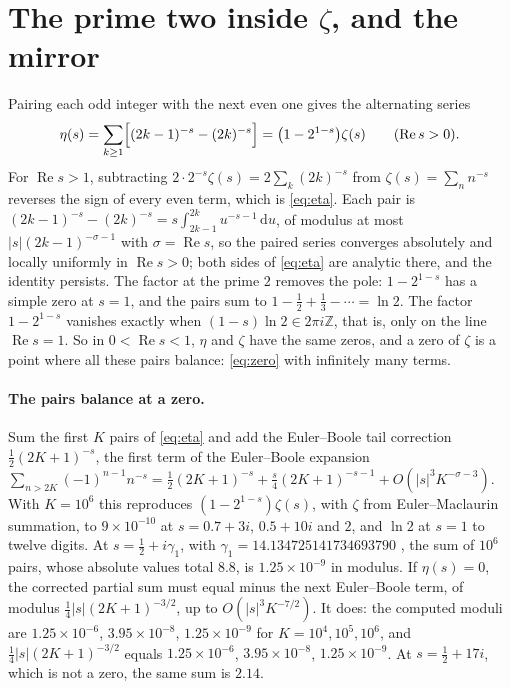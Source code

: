 \documentclass[11pt]{article}
\theoremstyle{definition}\newtheorem{definition}[theorem]{Definition}
\theoremstyle{remark}\newtheorem{remark}[theorem]{Remark}
\newcommand{\dd}{\,\mathrm d}\newcommand{\e}{\mathrm e}
\renewcommand{\Re}{\operatorname{Re}}\renewcommand{\Im}{\operatorname{Im}}
\begin{document}
\section{The prime two inside \texorpdfstring{$\zeta$}{zeta}, and the mirror}\label{sec:eta}
Pairing each odd integer with the next even one gives the alternating series
\begin{equation}\label{eq:eta}
\eta(s)=\sum_{k\ge1}\Bigl[(2k-1)^{-s}-(2k)^{-s}\Bigr]=\bigl(1-2^{1-s}\bigr)\zeta(s)\qquad(\Re s>0).
\end{equation}
For $\Re s>1$, subtracting $2\cdot2^{-s}\zeta(s)=2\sum_k(2k)^{-s}$ from $\zeta(s)=\sum_nn^{-s}$ reverses the sign of every even term, which is \eqref{eq:eta}. Each pair is $(2k-1)^{-s}-(2k)^{-s}=s\int_{2k-1}^{2k}u^{-s-1}\dd u$, of modulus at most $|s|(2k-1)^{-\sigma-1}$ with $\sigma=\Re s$, so the paired series converges absolutely and locally uniformly in $\Re s>0$; both sides of \eqref{eq:eta} are analytic there, and the identity persists. The factor at the prime $2$ removes the pole: $1-2^{1-s}$ has a simple zero at $s=1$, and the pairs sum to $1-\tfrac12+\tfrac13-\cdots=\ln2$. The factor $1-2^{1-s}$ vanishes exactly when $(1-s)\ln2\in2\pi i\mathbb Z$, that is, only on the line $\Re s=1$. So in $0<\Re s<1$, $\eta$ and $\zeta$ have the same zeros, and a zero of $\zeta$ is a point where all these pairs balance: \eqref{eq:zero} with infinitely many terms.

\paragraph{The pairs balance at a zero.} Sum the first $K$ pairs of \eqref{eq:eta} and add the Euler--Boole tail correction $\tfrac12(2K+1)^{-s}$, the first term of the Euler--Boole expansion $\sum_{n>2K}(-1)^{n-1}n^{-s}=\tfrac12(2K+1)^{-s}+\tfrac s4(2K+1)^{-s-1}+O(|s|^3K^{-\sigma-3})$. With $K=10^6$ this reproduces $(1-2^{1-s})\zeta(s)$, with $\zeta$ from Euler--Maclaurin summation, to $9\times10^{-10}$ at $s=0.7+3i$, $0.5+10i$ and $2$, and $\ln2$ at $s=1$ to twelve digits. At $s=\frac12+i\gamma_1$, with $\gamma_1=14.134725141734693790$ \cite{Odlyzko}, the sum of $10^6$ pairs, whose absolute values total $8.8$, is $1.25\times10^{-9}$ in modulus. If $\eta(s)=0$, the corrected partial sum must equal minus the next Euler--Boole term, of modulus $\tfrac14|s|(2K+1)^{-3/2}$, up to $O(|s|^3K^{-7/2})$. It does: the computed moduli are $1.25\times10^{-6}$, $3.95\times10^{-8}$, $1.25\times10^{-9}$ for $K=10^4,10^5,10^6$, and $\tfrac14|s|(2K+1)^{-3/2}$ equals $1.25\times10^{-6}$, $3.95\times10^{-8}$, $1.25\times10^{-9}$. At $s=\frac12+17i$, which is not a zero, the same sum is $2.14$.
\end{document}
